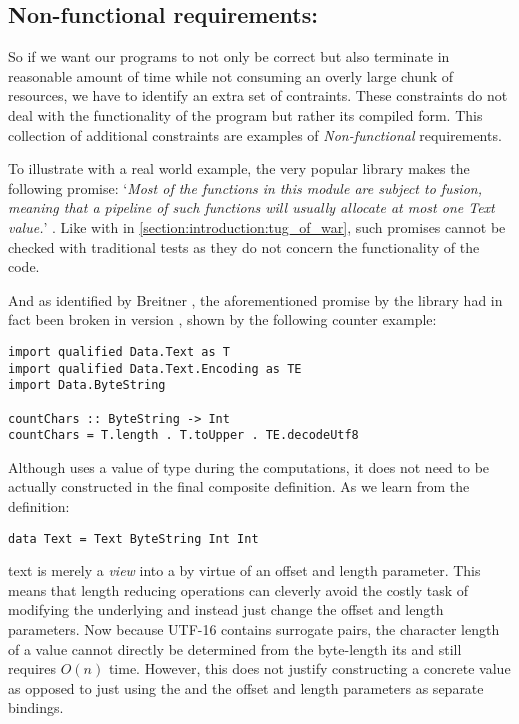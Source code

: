 \subsection{Non-functional requirements: }
\label{section:introduction_inspection_testing}

So if we want our programs to not only be correct but also terminate in reasonable amount of time while
not consuming an overly large chunk of resources, we have to identify an extra set of contraints. 
These constraints do not deal with the functionality of the program but rather its compiled form.
This collection of additional constraints are examples of \textit{Non-functional} requirements. 

To illustrate with a real world example, the very popular  library makes the following promise:
`\textit{Most of the functions in this module are subject to fusion, meaning that a pipeline of such functions will usually allocate at most one Text value.}'
\cite{inspection_testing}.
\label{section:introduction:inspection_testing}
Like with  in \cref{section:introduction:tug_of_war}, 
such promises cannot be checked with traditional tests as they do not concern the functionality of the code. 

And as identified by Breitner \cite{inspection_testing}, the aforementioned promise by the  library had in fact
been broken in version , shown by the following counter example:

\begin{verbatim}
import qualified Data.Text as T
import qualified Data.Text.Encoding as TE
import Data.ByteString

countChars :: ByteString -> Int
countChars = T.length . T.toUpper . TE.decodeUtf8
\end{verbatim}

Although  uses a value of type  during the computations, it does not
need to be actually constructed in the final composite definition. As we learn from the definition:

\begin{verbatim}
data Text = Text ByteString Int Int
\end{verbatim}

 text is merely a \textit{view} into a 
by virtue of an offset and length parameter. This means that length reducing operations can cleverly avoid the
costly task of modifying the underlying  and instead just change the offset and length parameters.
Now because UTF-16 contains surrogate pairs, the character length of a  value cannot directly be determined
from the byte-length its  and still requires $O(n)$ time. However, this does not justify constructing
a concrete  value as opposed to just using the  and the offset and length parameters as
separate bindings.


